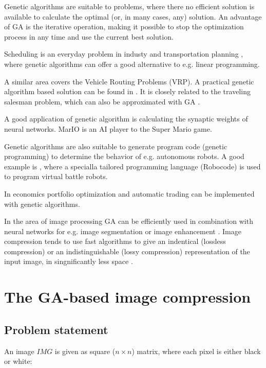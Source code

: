 \documentclass[conference]{IEEEtran}
\begin{document}
Genetic algorithms are suitable to problems, where
there no efficient solution is available to calculate
the optimal (or, in many cases, any) solution.
An advantage of GA is the iterative operation, making it possible
to stop the optimization process in any time and use the current
best solution.

Scheduling is an everyday problem in industy \cite{ga-scheduling}
and transportation planning \cite{ga-transport}, where genetic
algorithms can offer a good alternative to e.g. linear programming.

A similar area covers the Vehicle Routing Problems (VRP).
A practical genetic algorithm based solution can be found in \cite{ga-vrp}.
It is closely related to the traveling salesman problem, which
can also be approximated with GA \cite{ga-tsp}.

A good application of genetic algorithm is calculating
the synaptic weights of neural networks. MarIO \cite{mar-io}
is an AI player to the Super Mario game.

Genetic algorithms are also suitable to generate program code
(genetic programming) to determine the behavior of e.g.
autonomous robots. A good example is \cite{ga-robocode},
where a specialla tailored programming language (Robocode)
is used to program virtual battle robots.

In economics portfolio optimization \cite{ga-portfolio}
and automatic trading \cite{ga-trading}
can be implemented with genetic algorithms.

In the area of image processing GA can be
efficiently used in combination with neural networks for e.g.
image segmentation \cite{ga-imgseg} or image enhancement \cite{ga-imgenh}.
Image compression tends to use fast algorithms to give an
indentical (lossless compression) or an indistinguishable
(lossy compression) representation of the input image,
in singnificantly less space \cite{image-proc}.

\section{The GA-based image compression}

\subsection{Problem statement}

An image $IMG$ is given as square ($n \times n$) matrix, where each pixel is
either black or white:
\end{document}
